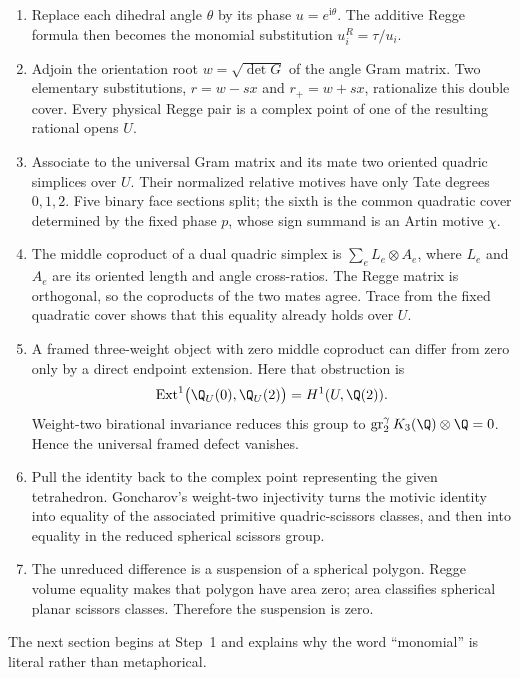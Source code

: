 \begin{enumerate}[label=\arabic*.,leftmargin=2.1em]
\item Replace each dihedral angle \(\theta\) by its phase
\(u=e^{\mathrm i\theta}\).  The additive Regge formula then becomes the
monomial substitution \(u_i^R=\tau/u_i\).

\item Adjoin the orientation root \(w=\sqrt{\det G}\) of the angle Gram
matrix.  Two elementary substitutions, \(r=w-sx\) and \(r_+=w+sx\),
rationalize this double cover.  Every physical Regge pair is a complex
point of one of the resulting rational opens \(U\).

\item Associate to the universal Gram matrix and its mate two oriented
quadric simplices over \(U\).  Their normalized relative motives have only
Tate degrees \(0,1,2\).  Five binary face sections split; the sixth is the
common quadratic cover determined by the fixed phase \(p\), whose sign
summand is an Artin motive \(\chi\).

\item The middle coproduct of a dual quadric simplex is
\(\sum_e L_e\otimes A_e\), where \(L_e\) and \(A_e\) are its oriented
length and angle cross-ratios.  The Regge matrix is orthogonal, so the
coproducts of the two mates agree.  Trace from the fixed quadratic cover
shows that this equality already holds over \(U\).

\item A framed three-weight object with zero middle coproduct can differ
from zero only by a direct endpoint extension.  Here that obstruction is
\[
 \Ext^1\bigl(\Q_U(0),\Q_U(2)\bigr)=H^1(U,\Q(2)).
\]
Weight-two birational invariance reduces this group to
\(\gr_2^\gamma K_3(\Q)\otimes\Q=0\).  Hence the universal framed defect
vanishes.

\item Pull the identity back to the complex point representing the given
tetrahedron.  Goncharov's weight-two injectivity turns the motivic identity
into equality of the associated primitive quadric-scissors classes, and
then into equality in the reduced spherical scissors group.

\item The unreduced difference is a suspension of a spherical polygon.
Regge volume equality makes that polygon have area zero; area classifies
spherical planar scissors classes.  Therefore the suspension is zero.
\end{enumerate}

The next section begins at Step~1 and explains why the word
``monomial'' is literal rather than metaphorical.
